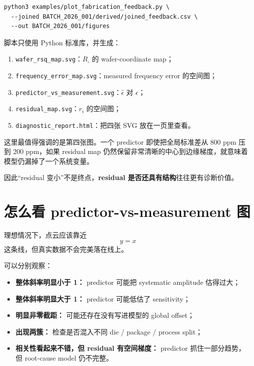 \begin{verbatim}
python3 examples/plot_fabrication_feedback.py \
  --joined BATCH_2026_001/derived/joined_feedback.csv \
  --out BATCH_2026_001/figures
\end{verbatim}

脚本只使用 Python 标准库，并生成：

\begin{enumerate}
  \item \texttt{wafer\_rsq\_map.svg}：$R_\square$ 的 wafer-coordinate map；
  \item \texttt{frequency\_error\_map.svg}：measured frequency error 的空间图；
  \item \texttt{predictor\_vs\_measurement.svg}：$\hat{\epsilon}$ 对 $\epsilon$；
  \item \texttt{residual\_map.svg}：$r_i$ 的空间图；
  \item \texttt{diagnostic\_report.html}：把四张 SVG 放在一页里查看。
\end{enumerate}

这里最值得强调的是第四张图。一个 predictor 即使把全局标准差从 800 ppm 压到 200 ppm，如果 residual map 仍然保留非常清晰的中心到边缘梯度，就意味着模型仍漏掉了一个系统变量。

因此“residual 变小”不是终点，\textbf{residual 是否还具有结构}往往更有诊断价值。

\section{怎么看 predictor-vs-measurement 图}

理想情况下，点云应该靠近
\[
y=x
\]
这条线，但真实数据不会完美落在线上。

可以分别观察：

\begin{itemize}
  \item \textbf{整体斜率明显小于 1：} predictor 可能把 systematic amplitude 估得过大；
  \item \textbf{整体斜率明显大于 1：} predictor 可能低估了 sensitivity；
  \item \textbf{明显非零截距：} 可能还存在没有写进模型的 global offset；
  \item \textbf{出现两簇：} 检查是否混入不同 die / package / process split；
  \item \textbf{相关性看起来不错，但 residual 有空间梯度：} predictor 抓住一部分趋势，但 root-cause model 仍不完整。
\end{itemize}

